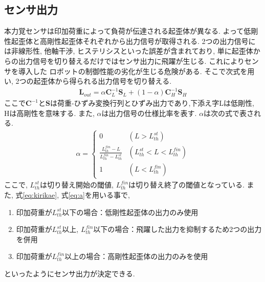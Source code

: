 \subsection{センサ出力}
本力覚センサは印加荷重によって負荷が伝達される起歪体が異なる.
よって低剛性起歪体と高剛性起歪体それぞれから出力信号が取得される.
2つの出力信号には非線形性, 他軸干渉, ヒステリシスといった誤差が含まれており, 
単に起歪体からの出力信号を切り替えるだけではセンサ出力に飛躍が生じる. これによりセンサを導入した
ロボットの制御性能の劣化が生じる危険がある. そこで次式を用い, 
2つの起歪体から得られる出力信号を切り替える. 
\begin{eqnarray}
  \bm{L}_{out} = \alpha \bm{C}^{-1}_L \bm{S}_{L}+\left( 1-\alpha \right)\bm{C}^{-1}_H \bm{S}_{H}
  \label{eq:kirikae}
\end{eqnarray}
ここで$\bm{C}^{-1}$と$\bm{S}$は荷重-ひずみ変換行列とひずみ出力であり,下添え字Lは低剛性, Hは高剛性を意味する. また, $\alpha$は出力信号の仕様比率を表す. 
$\alpha$は次の式で表される. 
\begin{eqnarray}
  \alpha = \left\{
    \begin{array}{ll}
      0 & (L > L^{st}_{th}) \\
      \frac{ L^{fin}_{th} - L }{ L^{fin}_{th} - L^{st}_{th} } & (L^{st}_{th} < L < L^{fin}_{th})\\
      1 & (L < L^{fin}_{th})
      \label{eq:a}
    \end{array}
  \right.
\end{eqnarray}
ここで, $L^{st}_{th}$は切り替え開始の閾値, $L^{fin}_{th}$は切り替え終了の閾値となっている. 
また, 式\eqref{eq:kirikae}, 式\eqref{eq:a}を用いる事で,
\begin{enumerate}
  \item 印加荷重が$L^{st}_{th}$以下の場合：低剛性起歪体の出力のみ使用
  \item 印加荷重が$L^{st}_{th}$以上, $L^{fin}_{th}$以下の場合：飛躍した出力を抑制するため2つの出力を併用
  \item 印加荷重が$L^{fin}_{th}$以上の場合：高剛性起歪体の出力のみを使用
\end{enumerate}
といったようにセンサ出力が決定できる. 